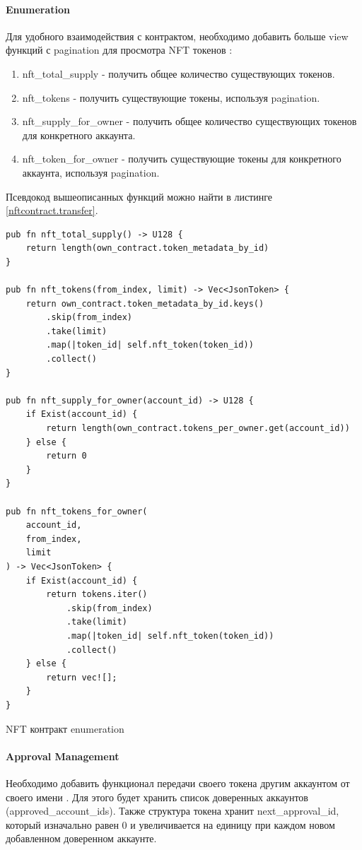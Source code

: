 \paragraph{Enumeration}
Для удобного взаимодействия с контрактом, необходимо добавить больше view функций с pagination для просмотра NFT токенов \cite{enumstandard}:
\begin{enumerate}
\item nft\_total\_supply - получить общее количество существующих токенов.
\item nft\_tokens - получить существующие токены, используя pagination.
\item nft\_supply\_for\_owner - получить общее количество существующих токенов для конкретного аккаунта.
\item nft\_token\_for\_owner - получить существующие токены для конкретного аккаунта, используя pagination.
\end{enumerate}

Псевдокод вышеописанных функций можно найти в листинге {\color{blue}\ref{nftcontract.transfer}}.

\begin{listing}
\begin{verbatim}
pub fn nft_total_supply() -> U128 {
    return length(own_contract.token_metadata_by_id)
}

pub fn nft_tokens(from_index, limit) -> Vec<JsonToken> {
    return own_contract.token_metadata_by_id.keys()
        .skip(from_index)
        .take(limit)
        .map(|token_id| self.nft_token(token_id))
        .collect()
}

pub fn nft_supply_for_owner(account_id) -> U128 {
    if Exist(account_id) {
        return length(own_contract.tokens_per_owner.get(account_id))
    } else {
        return 0
    }
}

pub fn nft_tokens_for_owner(
    account_id,
    from_index,
    limit
) -> Vec<JsonToken> {
    if Exist(account_id) {
        return tokens.iter()
            .skip(from_index)
            .take(limit)
            .map(|token_id| self.nft_token(token_id))
            .collect()
    } else {
        return vec![];
    }
}
\end{verbatim}
\caption{NFT контракт enumeration}
\label{nftcontract.transfer}
\end{listing}

\paragraph{Approval Management}
Необходимо добавить функционал передачи своего токена другим аккаунтом от своего имени \cite{approvalstandard}. Для этого будет хранить список доверенных аккаунтов (approved\_account\_ids).
Также структура токена хранит next\_approval\_id, который изначально равен 0 и увеличивается на единицу при каждом новом добавленном доверенном аккаунте.

